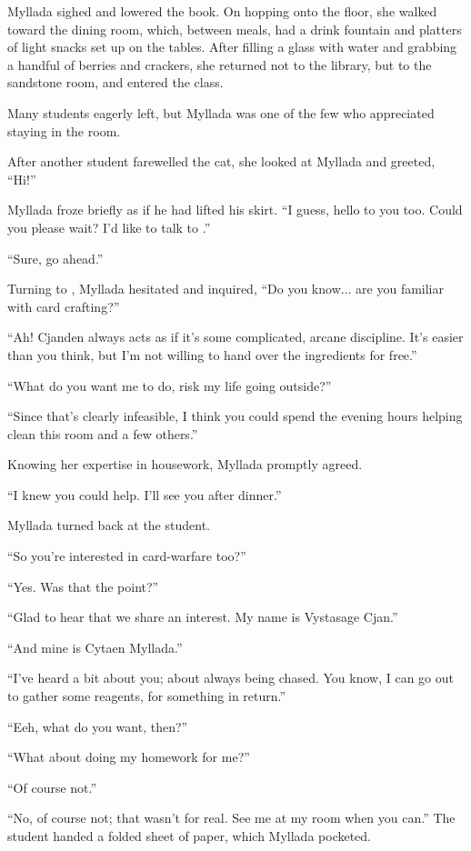 Myllada sighed and lowered the book. On hopping onto the floor, she walked toward the dining room, which, between meals, had a drink fountain and platters of light snacks set up on the tables. After filling a glass with water and grabbing a handful of berries and crackers, she returned not to the library, but to the sandstone room, and entered the class.

\centeredstars

Many students eagerly left, but Myllada was one of the few who appreciated staying in the room.

After another student farewelled the cat, she looked at Myllada and greeted, ``Hi!''

Myllada froze briefly as if he had lifted his skirt. ``I guess, hello to you too. Could you please wait? I'd like to talk to \yronsyncra.''

``Sure, go ahead.''

Turning to \yronsyncra, Myllada hesitated and inquired, ``Do you know... are you familiar with card crafting?''

``Ah! Cjanden always acts as if it's some complicated, arcane discipline. It's easier than you think, but I'm not willing to hand over the ingredients for free.''

``What do you want me to do, risk my life going outside?''

``Since that's clearly infeasible, I think you could spend the evening hours helping clean this room and a few others.''

Knowing her expertise in housework, Myllada promptly agreed.

``I knew you could help. I'll see you after dinner.''

Myllada turned back at the student.

``So you're interested in card-warfare too?''

``Yes. Was that the point?''

``Glad to hear that we share an interest. My name is Vystasage Cjan.''

``And mine is Cytaen Myllada.''

``I've heard a bit about you; about always being chased. You know, I can go out to gather some reagents, for something in return.''

``Eeh, what do you want, then?''

``What about doing my homework for me?''

``Of course not.''

``No, of course not; that wasn't for real. See me at my room when you can.'' The student handed a folded sheet of paper, which Myllada pocketed.

